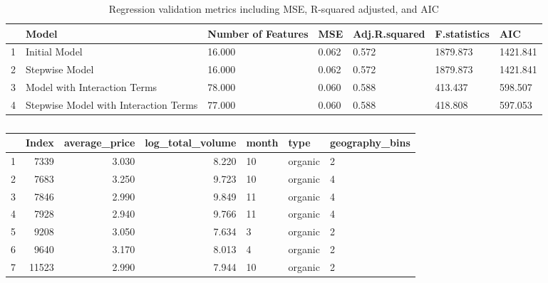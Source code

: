 \documentclass[11pt]{article}\usepackage[]{graphicx}\usepackage[]{color}
\begin{document}
\begin{center}
\begin{table}[ht]
\centering
\begin{tabular}{rp{1.5in}p{.8in}llll}
  \hline
 & Model & Number of Features & MSE & Adj.R.squared & F.statistics & AIC \\ 
  \hline
1 & Initial Model & 16.000 & 0.062 & 0.572 & 1879.873 & 1421.841 \\ 
  2 & Stepwise Model & 16.000 & 0.062 & 0.572 & 1879.873 & 1421.841 \\ 
  3 & Model with Interaction Terms & 78.000 & 0.060 & 0.588 & 413.437 & 598.507 \\ 
  4 & Stepwise Model with Interaction Terms & 77.000 & 0.060 & 0.588 & 418.808 & 597.053 \\ 
   \hline
\end{tabular}
\caption{Regression validation metrics including MSE, R-squared adjusted, and AIC} 
\label{reg_vali_metric}
\end{table}

\end{center} 


\begin{center}
\begin{table}[ht]
\centering
\begin{tabular}{rrrrlll}
  \hline
 & Index & average\_price & log\_total\_volume & month & type & geography\_bins \\ 
  \hline
1 & 7339 & 3.030 & 8.220 & 10 & organic & 2 \\ 
  2 & 7683 & 3.250 & 9.723 & 10 & organic & 4 \\ 
  3 & 7846 & 2.990 & 9.849 & 11 & organic & 4 \\ 
  4 & 7928 & 2.940 & 9.766 & 11 & organic & 4 \\ 
  5 & 9208 & 3.050 & 7.634 & 3 & organic & 2 \\ 
  6 & 9640 & 3.170 & 8.013 & 4 & organic & 2 \\ 
  7 & 11523 & 2.990 & 7.944 & 10 & organic & 2 \\ 
   \hline
\end{tabular}
\caption{} 
\label{outliers_table}
\end{table}

\end{center} 
\end{document}
